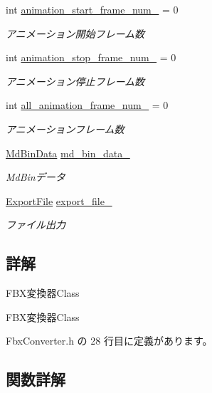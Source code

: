 \begin{DoxyCompactItemize}
int \mbox{\hyperlink{class_fbx_converter_a5ce2f08e1d77044d628949d3ad7572ca}{animation\+\_\+start\+\_\+frame\+\_\+num\+\_\+}} = 0
\begin{DoxyCompactList}\small\item\em アニメーション開始フレーム数 \end{DoxyCompactList}\item 
int \mbox{\hyperlink{class_fbx_converter_ad7d116416b9d843c79ca282841e398c7}{animation\+\_\+stop\+\_\+frame\+\_\+num\+\_\+}} = 0
\begin{DoxyCompactList}\small\item\em アニメーション停止フレーム数 \end{DoxyCompactList}\item 
int \mbox{\hyperlink{class_fbx_converter_adcb0b8e16e923953c16d1a171df50190}{all\+\_\+animation\+\_\+frame\+\_\+num\+\_\+}} = 0
\begin{DoxyCompactList}\small\item\em アニメーションフレーム数 \end{DoxyCompactList}\item 
\mbox{\hyperlink{class_md_bin_data}{Md\+Bin\+Data}} \mbox{\hyperlink{class_fbx_converter_a637b9f53af4fbc31a961e9e2204dfaf5}{md\+\_\+bin\+\_\+data\+\_\+}}
\begin{DoxyCompactList}\small\item\em Md\+Binデータ \end{DoxyCompactList}\item 
\mbox{\hyperlink{class_export_file}{Export\+File}} \mbox{\hyperlink{class_fbx_converter_ac840641172dc753b399902ea928b4ff6}{export\+\_\+file\+\_\+}}
\begin{DoxyCompactList}\small\item\em ファイル出力 \end{DoxyCompactList}\end{DoxyCompactItemize}


\subsection{詳解}
F\+B\+X変換器\+Class 

F\+B\+X変換器\+Class 

 Fbx\+Converter.\+h の 28 行目に定義があります。



\subsection{関数詳解}
\mbox{\label{class_fbx_converter_aa5a81e3afe4ea2bdc101863f6c1f0326}} 
